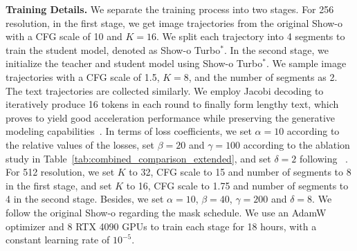 \noindent \textbf{Training Details.} 
We separate the training process into two stages.
For 256 resolution, in the first stage, we get image trajectories from the original Show-o with a CFG scale of 10 and $K=16$.
We split each trajectory into 4 segments to train the student model, denoted as Show-o Turbo$^*$. 
In the second stage, we initialize the teacher and student model using Show-o Turbo$^*$. We sample image trajectories with a CFG scale of 1.5, $K=8$, and the number of segments as 2.
The text trajectories are collected similarly.
We employ Jacobi decoding to iteratively produce 16 tokens in each round to finally form lengthy text, which proves to yield good acceleration performance while preserving the generative modeling capabilities~\cite{kou2024cllms}. 
In terms of loss coefficients, we set $\alpha=10$ according to the relative values of the losses, set $\beta=20$ and $\gamma=100$ according to the ablation study in Table~\ref{tab:combined_comparison_extended}, and set $\delta=2$ following ~\cite{xie2024show}.
For 512 resolution, we set $K$ to 32, CFG scale to 15 and number of segments to 8 in the first stage, and set $K$ to 16, CFG scale to 1.75 and number of segments to 4 in the second stage. 
Besides, we set $\alpha=10$, $\beta=40$, $\gamma=200$ and $\delta=8$.
We follow the original Show-o regarding the mask schedule.
We use an AdamW optimizer and 8 RTX 4090 GPUs to train each stage for 18 hours, with a constant learning rate of $10^{-5}$.


